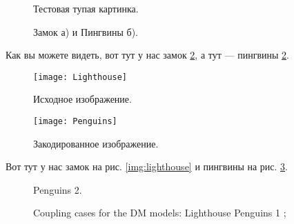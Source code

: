 \documentclass[a4paper,12pt]{report} %
\begin{document}
\tableofcontents %
\begin{figure}[h]
\caption{Тестовая тупая картинка.}
\label{img:image}
\end{figure}
\begin{figure}[h]
\begin{minipage}[h]{0.49\linewidth}
\end{minipage}
\hfill
\begin{minipage}[h]{0.49\linewidth}
\end{minipage}
\caption{Замок а) и Пингвины б).}
\label{img:castle_penguins}
\end{figure}
Как вы можете видеть, вот тут у нас замок \ref{img:castle_penguins}, а тут — пингвины \ref{img:castle_penguins}.
\begin{figure}[h]
\begin{center}
\begin{minipage}[h]{0.4\linewidth}
\texttt{[image: Lighthouse]}
\caption{Исходное изображение.} %
\label{img:lighthouse} %
\end{minipage}
\hfill 
\begin{minipage}[h]{0.4\linewidth}
\texttt{[image: Penguins]}
\caption{Закодированное изображение.}
\label{img:penguins}
\end{minipage}
\end{center}
\end{figure}
Вот тут у нас замок на рис. \ref{img:lighthouse} и пингвины на рис. \ref{img:penguins}.
\begin{figure}[ht!]
\vspace{-4ex}
\centering
{}
\hspace{4ex}
\hspace{4ex}
\caption{Coupling cases for the DM models: 
 Lighthouse
 Penguins 1 ; 
} Penguins 2.
\label{fig:threeDMcases}
\end{figure}
\end{document}
